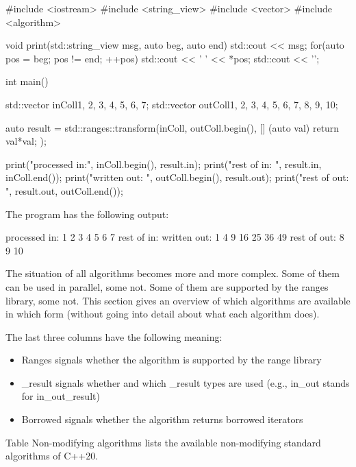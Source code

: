 \begin{cpp}
#include <iostream>
#include <string_view>
#include <vector>
#include <algorithm>

void print(std::string_view msg, auto beg, auto end)
{
	std::cout << msg;
	for(auto pos = beg; pos != end; ++pos) {
		std::cout << ' ' << *pos;
	}
	std::cout << '\n';
}

int main()
{
	std::vector inColl{1, 2, 3, 4, 5, 6, 7};
	std::vector outColl{1, 2, 3, 4, 5, 6, 7, 8, 9, 10};
	
	auto result = std::ranges::transform(inColl, outColl.begin(),
	[] (auto val) {
		return val*val;
	});
	
	print("processed in:", inColl.begin(), result.in);
	print("rest of in: ", result.in, inColl.end());
	print("written out: ", outColl.begin(), result.out);
	print("rest of out: ", result.out, outColl.end());
}
\end{cpp}

The program has the following output:

\begin{shell}
processed in: 1 2 3 4 5 6 7
rest of in:
written out: 1 4 9 16 25 36 49
rest of out: 8 9 10
\end{shell}


The situation of all algorithms becomes more and more complex. Some of them can be used in parallel, some not. Some of them are supported by the ranges library, some not. This section gives an overview of which algorithms are available in which form (without going into detail about what each algorithm does).

The last three columns have the following meaning:

\begin{itemize}
\item
Ranges signals whether the algorithm is supported by the range library

\item
\_result signals whether and which \_result types are used (e.g., in\_out stands for in\_out\_result)

\item
Borrowed signals whether the algorithm returns borrowed iterators
\end{itemize}

Table Non-modifying algorithms lists the available non-modifying standard algorithms of C++20.

